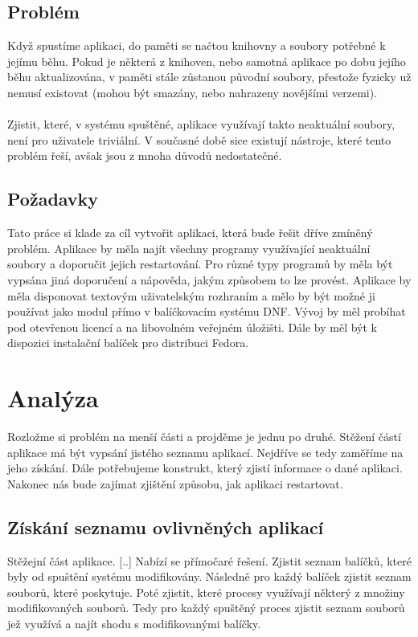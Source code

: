 \documentclass[10pt,a4paper]{article}
\begin{document}
		\subsection{Problém}
		Když spustíme aplikaci, do paměti se načtou knihovny a soubory potřebné k jejímu běhu. Pokud je některá z knihoven, nebo samotná aplikace po dobu jejího běhu aktualizována, v paměti stále zůstanou původní soubory, přestože fyzicky už nemusí existovat (mohou být smazány, nebo nahrazeny novějšími verzemi).
		\\\\
		Zjistit, které, v systému spuštěné, aplikace využívají takto neaktuální soubory, není pro uživatele triviální. V současné době sice existují nástroje, které tento problém řeší, avšak jsou z mnoha důvodů nedostatečné.

		\subsection{Požadavky}
		Tato práce si klade za cíl vytvořit aplikaci, která bude řešit dříve zmíněný problém. Aplikace by měla najít všechny programy využívající neaktuální soubory a doporučit jejich restartování. Pro různé typy programů by měla být vypsána jiná doporučení a nápověda, jakým způsobem to lze provést. Aplikace by měla disponovat textovým uživatelským rozhraním a mělo by být možné ji používat jako modul přímo v balíčkovacím systému DNF\@. Vývoj by měl probíhat pod otevřenou licencí a na libovolném veřejném úložišti. Dále by měl být k dispozici instalační balíček pro distribuci Fedora.

	\section{Analýza}
	Rozložme si problém na menší části a projděme je jednu po druhé. Stěžení částí aplikace má být vypsání jistého seznamu aplikací. Nejdříve se tedy zaměříme na jeho získání. Dále potřebujeme konstrukt, který zjistí informace o  dané aplikaci. Nakonec nás bude zajímat zjištění způsobu, jak aplikaci restartovat.

		\subsection{Získání seznamu ovlivněných aplikací}
		Stěžejní část aplikace. [..] Nabízí se přímočaré řešení. Zjistit seznam balíčků, které byly od spuštění systému modifikovány. Následně pro každý balíček zjistit seznam souborů, které poskytuje. Poté zjistit, které procesy využívají některý z množiny modifikovaných souborů. Tedy pro každý spuštěný proces zjistit seznam souborů jež využívá a najít shodu s modifikovanými balíčky.
\end{document}
